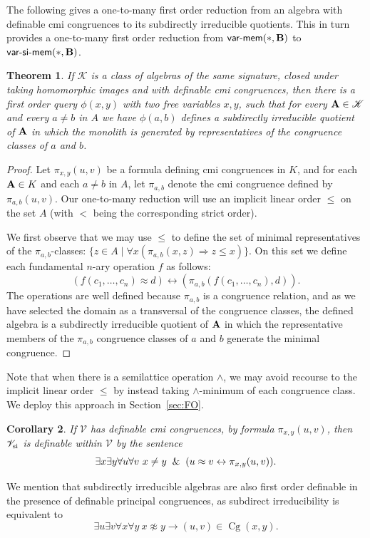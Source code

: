 \documentclass[reqno]{amsart}
\theoremstyle{plain}
\newtheorem{thm}{Theorem}[section]
\newtheorem{cor}[thm]{Corollary}
\theoremstyle{definition}
\newcommand{\varmem}{\textsf{var-mem}}
\newcommand{\varsimem}{\textsf{var-si-mem}}
\newcommand{\Cg}{\operatorname{Cg}}
\begin{document}
The following gives a one-to-many first order reduction from an algebra with definable cmi congruences to its subdirectly irreducible quotients.  This in turn provides a one-to-many first order reduction from $\varmem(*,{\bf B})$ to $\varsimem(*,{\bf B})$.
\begin{thm}\label{thm:fodecomp}
If $\mathscr{K}$ is a class of algebras of the same signature, closed under taking homomorphic images and with definable cmi congruences, then there is a first order query $\phi(x,y)$ with two free variables $x,y$, such that for every ${\bf A}\in \mathscr{K}$ and every $a\neq b$ in $A$ we have $\phi(a,b)$ defines a subdirectly irreducible quotient of ${\bf A}$ in which the monolith  is generated by representatives of the congruence classes of $a$ and $b$.
\end{thm}
\begin{proof}
Let $\pi_{x,y}(u,v)$ be a formula defining cmi congruences in $K$, and for each ${\bf A}\in K$ and each $a\neq b$ in $A$, let $\pi_{a,b}$ denote the cmi congruence defined by $\pi_{a,b}(u,v)$.  Our one-to-many reduction will  use an implicit linear order $\leq$ on the set $A$ (with $<$ being the corresponding strict order).   

We first observe that we may use $\leq$ to define the set of minimal representatives of the $\pi_{a,b}$-classes: $\{z\in A\mid \forall x (\pi_{a,b}(x,z)\Rightarrow z\leq x)\}$.  On this set we define each fundamental $n$-ary operation $f$ as follows:
\[
(f(c_1,\dots,c_n)\approx d)\leftrightarrow (\pi_{a,b}(f(c_1,\dots,c_n),d)).
\]
The operations are well defined because $\pi_{a,b}$ is a congruence relation, and as we have selected the domain as a transversal of the congruence classes, the defined algebra is a subdirectly irreducible quotient of ${\bf A}$ in which the representative members of the $\pi_{a,b}$ congruence classes of $a$ and $b$ generate the minimal congruence.
\end{proof}
Note that when there is a semilattice operation $\wedge$, we may avoid recourse to the implicit linear order $\leq$ by instead taking $\wedge$-minimum of each congruence class.  We deploy this approach in Section~\ref{sec:FO}.
\begin{cor}
If $\mathscr{V}$ has definable cmi congruences, by formula $\pi_{x,y}(u,v)$, then~$\mathscr{V}_{\rm si}$ is definable within $\mathscr{V}$ by the sentence 
\[
\exists x\exists y\forall u\forall v\ x\neq y\And (u\approx v\leftrightarrow \pi_{x,y}(u,v)).
\]
\end{cor}
We mention that subdirectly irreducible algebras are also first order definable in the presence of definable principal congruences, as subdirect irreducibility is equivalent to 
\[
\exists u\exists v \forall x\forall y\  x\not\approx y\rightarrow (u,v)\in \Cg(x,y).
\]
\end{document}
